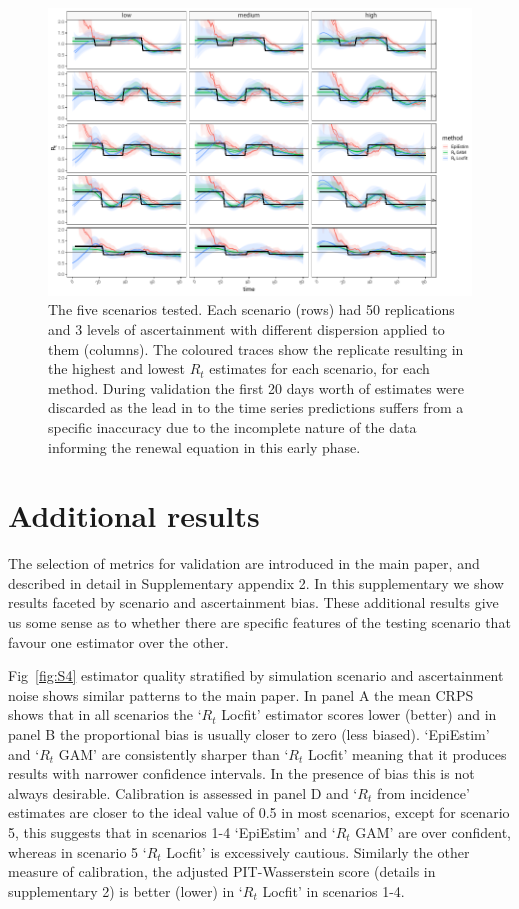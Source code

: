 \documentclass[a4paper, 12pt, twoside]{article}
\let\Oldsection\section
\renewcommand{\section}{\FloatBarrier\Oldsection}
\begin{document}
\begin{figure}[h!]
\centering
  \includegraphics{fig/fig3-scenario-estimates}
  \caption{The five scenarios tested. Each scenario (rows) had 50 replications and 3 levels of ascertainment with different dispersion applied to them (columns). The coloured traces show the replicate resulting in the highest and lowest $R_t$ estimates for each scenario, for each method. During validation the first 20 days worth of estimates were discarded as the lead in to the time series predictions suffers from a specific inaccuracy due to the incomplete nature of the data informing the renewal equation in this early phase.}
\label{fig:S3}
\end{figure}

\clearpage

\section{Additional results}

The selection of metrics for validation are introduced in the main paper, and described in detail in Supplementary appendix 2. In this supplementary we show results faceted by scenario and ascertainment bias. These additional results give us some sense as to whether there are specific features of the testing scenario that favour one estimator over the other.

Fig~\ref{fig:S4} estimator quality stratified by simulation scenario and ascertainment noise shows similar patterns to the main paper. In panel A the mean CRPS shows that in all scenarios the `$R_t$ Locfit' estimator scores lower (better) and in panel B the proportional bias is usually closer to zero (less biased). `EpiEstim' and `$R_t$ GAM' are consistently sharper than `$R_t$ Locfit' meaning that it produces results with narrower confidence intervals. In the presence of bias this is not always desirable. Calibration is assessed in panel D and `$R_t$ from incidence' estimates are closer to the ideal value of 0.5 in most scenarios, except for scenario 5, this suggests that in scenarios 1-4 `EpiEstim' and `$R_t$ GAM' are over confident, whereas in scenario 5 `$R_t$ Locfit' is excessively cautious. Similarly the other measure of calibration, the adjusted PIT-Wasserstein score (details in supplementary 2) is better (lower) in `$R_t$ Locfit' in scenarios 1-4.
\end{document}

